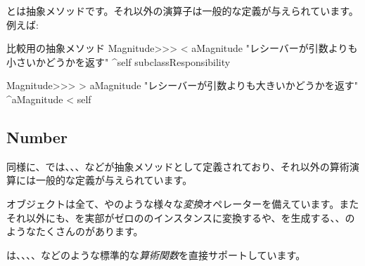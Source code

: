 \documentclass[a4paper,10pt,twoside]{book}
\begin{document}
とは抽象メソッドです。それ以外の演算子は一般的な定義が与えられています。例えば:

\begin{method}{比較用の抽象メソッド}
Magnitude>>> < aMagnitude 
    "レシーバーが引数よりも小さいかどうかを返す"
    ^self subclassResponsibility

Magnitude>>> > aMagnitude 
    "レシーバーが引数よりも大きいかどうかを返す"
    ^aMagnitude < self
\end{method}

\subsection{Number}

同様に、では、、、などが抽象メソッドとして定義されており、それ以外の算術演算には一般的な定義が与えられています。

オブジェクトは全て、やのような様々な\emph{変換}オペレーターを備えています。またそれ以外にも、を実部がゼロののインスタンスに変換するや、を生成する、、のようなたくさんのがあります。

は、、、、などのような標準的な\emph{算術関数}を直接サポートしています。
\end{document}
